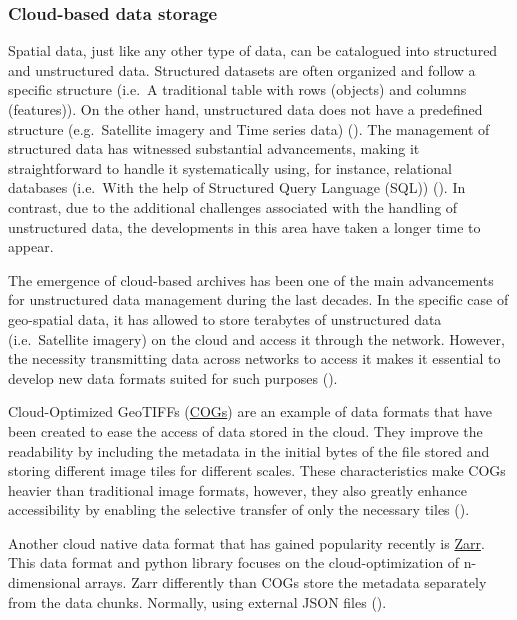 \documentclass[
  oneside,
  open=any]{scrbook}
\begin{document}
\subsubsection{Cloud-based data storage}\label{cloud-based-data-storage}

Spatial data, just like any other type of data, can be catalogued into
structured and unstructured data. Structured datasets are often
organized and follow a specific structure (i.e.~A traditional table with
rows (objects) and columns (features)). On the other hand, unstructured
data does not have a predefined structure (e.g.~Satellite imagery and
Time series data) (). The management of structured data has witnessed
substantial advancements, making it straightforward to handle it
systematically using, for instance, relational databases (i.e.~With the
help of Structured Query Language (SQL))
(). In
contrast, due to the additional challenges associated with the handling
of unstructured data, the developments in this area have taken a longer
time to appear.

The emergence of cloud-based archives has been one of the main
advancements for unstructured data management during the last decades.
In the specific case of geo-spatial data, it has allowed to store
terabytes of unstructured data (i.e.~Satellite imagery) on the cloud and
access it through the network. However, the necessity transmitting data
across networks to access it makes it essential to develop new data
formats suited for such purposes
().

Cloud-Optimized GeoTIFFs (\href{https://www.cogeo.org/}{COGs}) are an
example of data formats that have been created to ease the access of
data stored in the cloud. They improve the readability by including the
metadata in the initial bytes of the file stored and storing different
image tiles for different scales. These characteristics make COGs
heavier than traditional image formats, however, they also greatly
enhance accessibility by enabling the selective transfer of only the
necessary tiles ().

Another cloud native data format that has gained popularity recently is
\href{https://zarr.readthedocs.io/en/stable/}{Zarr}. This data format
and python library focuses on the cloud-optimization of n-dimensional
arrays. Zarr differently than COGs store the metadata separately from
the data chunks. Normally, using external JSON files
().
\end{document}
